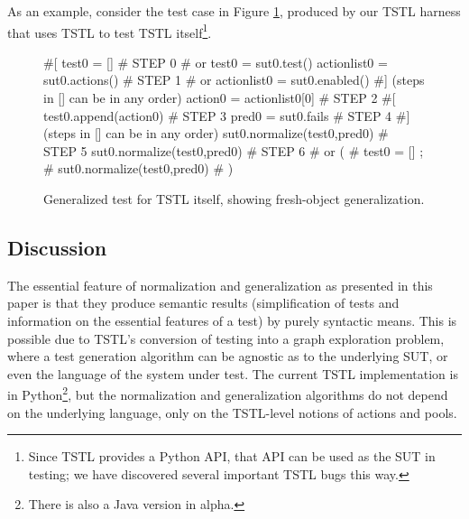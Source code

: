 As an example, consider the test case in Figure \ref{fig:mislead},
produced by our TSTL harness that uses TSTL to test TSTL itself\footnote{Since
TSTL provides a Python API, that API can be used as the SUT in
testing; we have discovered several important TSTL bugs this way.}.

\begin{figure}
{\scriptsize
\begin{code}
\textcolor{black!45}{\#[}
test0 = []                             \textcolor{black!45}{\# STEP 0}
\textcolor{black!45}{\#  or test0 = sut0.test() }
actionlist0 = sut0.actions()           \textcolor{black!45}{\# STEP 1}
\textcolor{black!45}{\#  or actionlist0 = sut0.enabled() }
\textcolor{black!45}{\#] (steps in [] can be in any order)}
action0 = actionlist0[0]               \textcolor{black!45}{\# STEP 2}
\textcolor{black!45}{\#[}
test0.append(action0)                  \textcolor{black!45}{\# STEP 3}
pred0 = sut0.fails                     \textcolor{black!45}{\# STEP 4}
\textcolor{black!45}{\#] (steps in [] can be in any order)}
sut0.normalize(test0,pred0)            \textcolor{black!45}{\# STEP 5}
sut0.normalize(test0,pred0)            \textcolor{black!45}{\# STEP 6}
\textcolor{black!45}{\#  or (}
\textcolor{black!45}{\#      test0 = []  ;}
\textcolor{black!45}{\#      sut0.normalize(test0,pred0) }
\textcolor{black!45}{\#     )}
\end{code}
}
\caption{Generalized test for TSTL itself, showing fresh-object
  generalization.}
\label{fig:mislead}
\end{figure}


\subsection{Discussion}

The essential feature of normalization and generalization as presented
in this paper is that they produce semantic results (simplification of
tests and information on the essential features of a test) by purely
syntactic means.  This is possible due to TSTL's conversion of testing
into a graph exploration problem, where a test generation algorithm
can be agnostic as to the underlying SUT, or even the language of the
system under test.  The current TSTL implementation is in
Python\footnote{There is also a Java version in alpha.}, but the
normalization and generalization algorithms do not depend on the
underlying language, only on the TSTL-level notions of actions and pools.